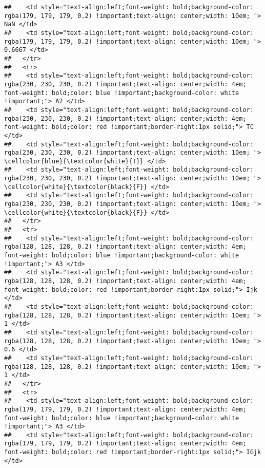 \documentclass[
]{article}
\begin{document}
\begin{verbatim}
##    <td style="text-align:left;font-weight: bold;background-color: rgba(179, 179, 179, 0.2) !important;text-align: center;width: 10em; "> NaN </td>
##    <td style="text-align:left;font-weight: bold;background-color: rgba(179, 179, 179, 0.2) !important;text-align: center;width: 10em; "> 0.6667 </td>
##   </tr>
##   <tr>
##    <td style="text-align:left;font-weight: bold;background-color: rgba(230, 230, 230, 0.2) !important;text-align: center;width: 4em; font-weight: bold;color: blue !important;background-color: white !important;"> A2 </td>
##    <td style="text-align:left;font-weight: bold;background-color: rgba(230, 230, 230, 0.2) !important;text-align: center;width: 4em; font-weight: bold;color: red !important;border-right:1px solid;"> TC </td>
##    <td style="text-align:left;font-weight: bold;background-color: rgba(230, 230, 230, 0.2) !important;text-align: center;width: 10em; "> \cellcolor{blue}{\textcolor{white}{T}} </td>
##    <td style="text-align:left;font-weight: bold;background-color: rgba(230, 230, 230, 0.2) !important;text-align: center;width: 10em; "> \cellcolor{white}{\textcolor{black}{F}} </td>
##    <td style="text-align:left;font-weight: bold;background-color: rgba(230, 230, 230, 0.2) !important;text-align: center;width: 10em; "> \cellcolor{white}{\textcolor{black}{F}} </td>
##   </tr>
##   <tr>
##    <td style="text-align:left;font-weight: bold;background-color: rgba(128, 128, 128, 0.2) !important;text-align: center;width: 4em; font-weight: bold;color: blue !important;background-color: white !important;"> A3 </td>
##    <td style="text-align:left;font-weight: bold;background-color: rgba(128, 128, 128, 0.2) !important;text-align: center;width: 4em; font-weight: bold;color: red !important;border-right:1px solid;"> Ijk </td>
##    <td style="text-align:left;font-weight: bold;background-color: rgba(128, 128, 128, 0.2) !important;text-align: center;width: 10em; "> 1 </td>
##    <td style="text-align:left;font-weight: bold;background-color: rgba(128, 128, 128, 0.2) !important;text-align: center;width: 10em; "> 0.6 </td>
##    <td style="text-align:left;font-weight: bold;background-color: rgba(128, 128, 128, 0.2) !important;text-align: center;width: 10em; "> 1 </td>
##   </tr>
##   <tr>
##    <td style="text-align:left;font-weight: bold;background-color: rgba(179, 179, 179, 0.2) !important;text-align: center;width: 4em; font-weight: bold;color: blue !important;background-color: white !important;"> A3 </td>
##    <td style="text-align:left;font-weight: bold;background-color: rgba(179, 179, 179, 0.2) !important;text-align: center;width: 4em; font-weight: bold;color: red !important;border-right:1px solid;"> IGjk </td>

\end{verbatim}
\end{document}
